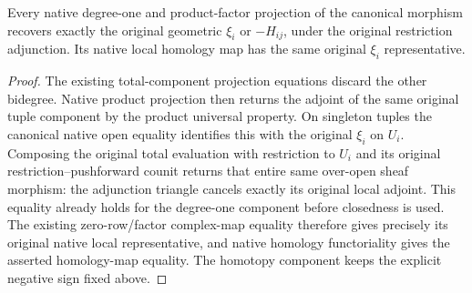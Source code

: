 \begin{theorem}
\label{thm:di-actual-witt-cech-one-local-evaluation}
\leanok
{}
Every native degree-one and product-factor projection of the canonical
morphism recovers exactly the original geometric $\xi_i$ or $-H_{ij}$,
under the original restriction adjunction. Its native local homology map
has the same original $\xi_i$ representative.
\end{theorem}
\begin{proof}
The existing total-component projection equations discard the other
bidegree. Native product projection then returns the adjoint of the same
original tuple component by the product universal property. On singleton
tuples the canonical native open equality identifies this with the
original $\xi_i$ on $U_i$. Composing the original total evaluation with
restriction to $U_i$ and its original restriction--pushforward counit
returns that entire same over-open sheaf morphism: the adjunction
triangle cancels exactly its original local adjoint. This equality
already holds for the degree-one component before closedness is used.
The existing zero-row/factor complex-map equality
therefore gives precisely its original native local representative, and
native homology functoriality gives the asserted homology-map equality.
The homotopy component keeps the explicit negative sign fixed above.
\end{proof}
